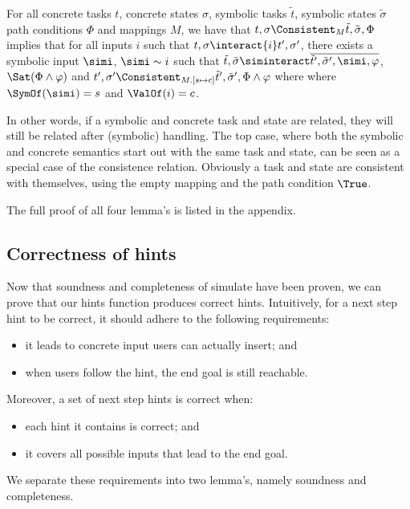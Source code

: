 \begin{lemma}
  \label{lem:completeinteracting}
  For all concrete tasks $t$, concrete states $\sigma$, symbolic tasks $\tilde{t}$, symbolic states $\tilde{\sigma}$ path conditions $\Phi$ and mappings $M$,
  we have that $t,\sigma\Consistent_{M}\tilde{t},\tilde{\sigma},\Phi$ implies
  that for all inputs $i$ such that $t,\sigma\interact{i}t',\sigma'$,
  there exists a symbolic input $\simi$, $\simi\sim i$ such that
  $\tilde{t},\tilde{\sigma}\siminteract\overline{\tilde{t}',\tilde{\sigma}',\simi,\phi}$, $\Sat(\Phi\land\phi)$ and $t',\sigma'\Consistent_{M.[s\mapsto c]}\tilde{t}',\tilde{\sigma}',\Phi\land\phi$ where where $\SymOf(\simi)=s$ and $\ValOf(i)=c$.
\end{lemma}

In other words, if a symbolic and concrete task and state are related, they will still be related after (symbolic) handling.
The top case, where both the symbolic and concrete semantics start out with the same task and state,
can be seen as a special case of the consistence relation.
Obviously a task and state are consistent with themselves, using the empty mapping and the path condition $\True$.

The full proof of all four lemma's is listed in the appendix.


\subsection{Correctness of hints}

Now that soundness and completeness of simulate have been proven, we can prove that our hints function produces correct hints.
Intuitively, for a next step hint to be correct, it should adhere to the following requirements:
\begin{itemize}
  \item it leads to concrete input users can actually insert; and
  \item when users follow the hint, the end goal is still reachable.
\end{itemize}
Moreover, a set of next step hints is correct when:
\begin{itemize}
  \item each hint it contains is correct; and
  \item it covers all possible inputs that lead to the end goal.
\end{itemize}

We separate these requirements into two lemma's, namely soundness and completeness.

